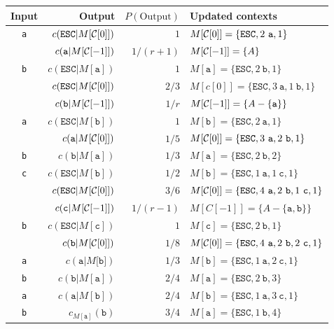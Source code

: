 \documentclass{article}
\begin{document}
\thispagestyle{empty}
\begin{tabular}{crrl}
  Input & Output & $P(\text{Output})$ & Updated contexts\\
  \hline
  {\tt a} & $c(\mathtt{ESC}|M[{\cal C}[0]])$ & $1$ & $M[{\cal C}[0]]=\{\mathtt{ESC},2~\mathtt{a},1\}$\\
  ~ & $c(\mathtt{a}|M[{\cal C}[-1]])$ & $1/(r+1)$ & $M[{\cal C}[-1]]=\{A\}$\\
  {\tt b} & $c(\mathtt{ESC}|M[\texttt{a}])$ & $1$ & $M[\mathtt{a}]=\{\mathtt{ESC},2~\mathtt{b},1\}$\\
  ~ & $c(\mathtt{ESC}|M[{\cal C}[0]])$ & $2/3$ & $M[c[0]]=\{\mathtt{ESC},3~\mathtt{a},1~\mathtt{b},1\}$\\
  ~ & $c(\mathtt{b}|M[{\cal C}[-1]])$ & $1/r$ & $M[{\cal C}[-1]]=\{A-\{\mathtt{a}\}\}$ \\
  {\tt a} & $c(\mathtt{ESC}|M[\texttt{b}])$ & $1$ & $M[\mathtt{b}]=\{\mathtt{ESC},2~\mathtt{a},1\}$\\
 ~ & $c(\mathtt a|M[{\cal C}[0]])$ & $1/5$ & $M[{\cal C}[0]]=\{\mathtt{ESC},3~\mathtt{a},2~\mathtt{b},1\}$\\
  {\tt b} & $c(\mathtt b|M[\mathtt{a}])$ & $1/3$ & $M[\mathtt{a}]=\{\mathtt{ESC},2~\mathtt{b},2\}$\\
  {\tt c} & $c(\mathtt{ESC}|M[\mathtt{b}])$ & $1/2$ & $M[\mathtt{b}]=\{\mathtt{ESC},1~\mathtt{a},1~\mathtt{c},1\}$\\
  ~ & $c(\mathtt{ESC}|M[{\cal C}[0]])$ & $3/6$ & $M[{\cal C}[0]]=\{\mathtt{ESC},4~\mathtt{a},2~\mathtt{b},1~\mathtt{c},1\}$\\
  ~ & $c(\mathtt c|M[{\cal C}[-1]])$ & $1/(r-1)$ & $M[C[-1]]=\{A-\{\mathtt{a},\mathtt{b}\}\}$\\
  {\tt b} & $c(\mathtt{ESC}|M[\texttt{c}])$ & $1$ & $M[\mathtt{c}]=\{\mathtt{ESC},2~\mathtt{b},1\}$\\
  ~ & $c(\mathtt b|M[{\cal C}[0]])$ & $1/8$ & $M[{\cal C}[0]]=\{\mathtt{ESC},4~\mathtt{a},2~\mathtt{b},2~\mathtt{c},1\}$\\
  {\tt a} & $c(\mathtt a|M[\mathtt{b]})$ & $1/3$ & $M[\mathtt{b}]=\{\mathtt{ESC},1~\mathtt{a},2~\mathtt{c},1\}$\\
  {\tt b} & $c(\mathtt b|M[\mathtt{a}])$ & $2/4$ & $M[\mathtt{a}]=\{\mathtt{ESC},2~\mathtt{b},3\}$\\
    {\tt a} & $c(\mathtt a|M[\mathtt{b}])$ & $2/4$ & $M[\mathtt{b}]=\{\mathtt{ESC},1~\mathtt{a},3~\mathtt{c},1\}$\\
    {\tt b} & $c_{M[\mathtt{a}]}(\mathtt b)$ & $3/4$ & $M[\mathtt{a}]=\{\mathtt{ESC},1~\mathtt{b},4\}$\\

\end{tabular}
\end{document}
